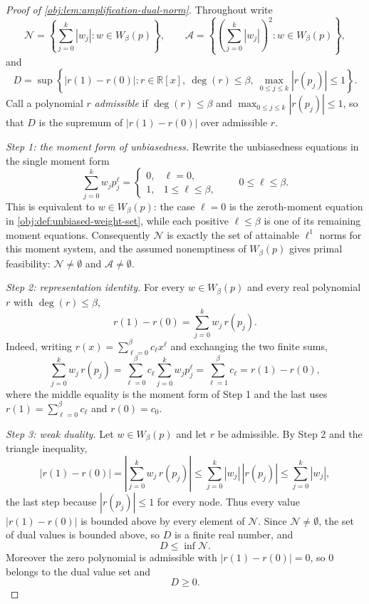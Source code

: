 \documentclass[11pt]{article}
\begin{document}
\begin{proof}[Proof of \cref{obj:lem:amplification-dual-norm}]
Throughout write
\[
\mathcal N=\left\{\sum_{j=0}^k |w_j|:w\in W_\beta(p)\right\},
\qquad
\mathcal A=\left\{\left(\sum_{j=0}^k |w_j|\right)^2:w\in W_\beta(p)\right\},
\]
and
\[
D=
\sup\left\{
|r(1)-r(0)|:
r\in\mathbb R[x],\ \deg(r)\le\beta,\ \max_{0\le j\le k}|r(p_j)|\le1
\right\}.
\]
Call a polynomial \(r\) \emph{admissible} if \(\deg(r)\le\beta\) and \(\max_{0\le j\le k}|r(p_j)|\le1\), so that \(D\) is the supremum of \(|r(1)-r(0)|\) over admissible \(r\).

\emph{Step 1: the moment form of unbiasedness.}
Rewrite the unbiasedness equations in the single moment form
\[
\sum_{j=0}^k w_jp_j^\ell=
\begin{cases}
0,&\ell=0,\\
1,&1\le \ell\le\beta,
\end{cases}
\qquad 0\le\ell\le\beta .
\]
This is equivalent to \(w\in W_\beta(p)\): the case \(\ell=0\) is the zeroth-moment equation in \cref{obj:def:unbiased-weight-set}, while each positive \(\ell\le\beta\) is one of its remaining moment equations. %
Consequently \(\mathcal N\) is exactly the set of attainable \(\ell^1\) norms for this moment system, and the assumed nonemptiness of \(W_\beta(p)\) gives primal feasibility: \(\mathcal N\ne\emptyset\) and \(\mathcal A\ne\emptyset\). %

\emph{Step 2: representation identity.}
For every \(w\in W_\beta(p)\) and every real polynomial \(r\) with \(\deg(r)\le\beta\),
\[
r(1)-r(0)=\sum_{j=0}^k w_j\,r(p_j).
\]
Indeed, writing \(r(x)=\sum_{\ell=0}^{\beta}c_\ell x^\ell\) and exchanging the two finite sums,
\[
\sum_{j=0}^k w_j\,r(p_j)
=
\sum_{\ell=0}^{\beta}c_\ell\sum_{j=0}^k w_jp_j^\ell
=
\sum_{\ell=1}^{\beta}c_\ell
=
r(1)-r(0),
\]
where the middle equality is the moment form of Step 1 and the last uses \(r(1)=\sum_{\ell=0}^{\beta}c_\ell\) and \(r(0)=c_0\). %

\emph{Step 3: weak duality.}
Let \(w\in W_\beta(p)\) and let \(r\) be admissible. By Step 2 and the triangle inequality,
\[
|r(1)-r(0)|
=
\left|\sum_{j=0}^k w_j\,r(p_j)\right|
\le
\sum_{j=0}^k |w_j|\,|r(p_j)|
\le
\sum_{j=0}^k |w_j| ,
\]
the last step because \(|r(p_j)|\le1\) for every node. %
Thus every value \(|r(1)-r(0)|\) is bounded above by every element of \(\mathcal N\). Since \(\mathcal N\ne\emptyset\), the set of dual values is bounded above, so \(D\) is a finite real number, and
\[
D\le \inf\mathcal N .
\] %
Moreover the zero polynomial is admissible with \(|r(1)-r(0)|=0\), so \(0\) belongs to the dual value set and
\[
D\ge 0 .
\] %


\end{proof}
\end{document}
